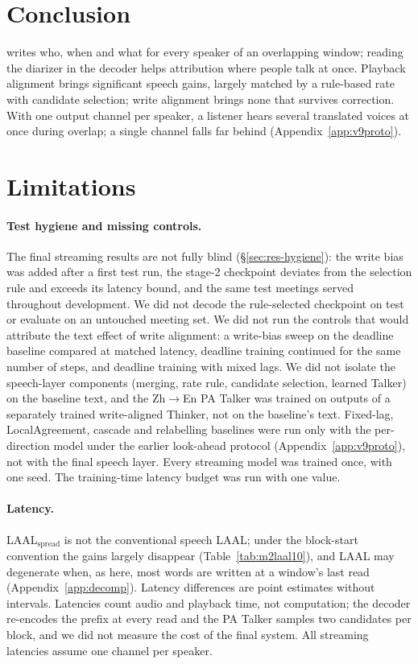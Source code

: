 \section{Conclusion}
\label{sec:conclusion}

\sys{} writes who, when and what for every speaker of an overlapping window; reading the diarizer in the decoder helps
attribution where people talk at once. Playback alignment brings significant speech gains, largely
matched by a rule-based rate with candidate selection; write alignment brings none that survives correction. With one
output channel per speaker, a listener hears several translated voices at once during overlap; a single channel falls
far behind (Appendix~\ref{app:v9proto}).

\section*{Limitations}

\paragraph{Test hygiene and missing controls.} The final streaming results are not fully blind
(\S\ref{sec:res-hygiene}): the write bias was added after a first test run, the stage-2 checkpoint deviates from the
selection rule and exceeds its latency bound, and the same test meetings served throughout development. We did not
decode the rule-selected checkpoint on test or evaluate on an untouched meeting set. We did not run the controls that
would attribute the text effect of write alignment: a write-bias sweep on the deadline baseline compared at matched
latency, deadline training continued for the same number of steps, and deadline training with mixed lags. We did not
isolate the speech-layer components (merging, rate rule, candidate selection, learned Talker) on the baseline text, and
the Zh$\rightarrow$En PA Talker was trained on outputs of a separately trained write-aligned Thinker, not on the
baseline's text. Fixed-lag, LocalAgreement, cascade and relabelling baselines were run only with the per-direction model under
the earlier look-ahead protocol (Appendix~\ref{app:v9proto}), not with the final speech layer. Every streaming model was
trained once, with one seed. The training-time latency budget was run with one value.

\paragraph{Latency.} LAAL$_\text{spread}$ is not the conventional speech LAAL; under the block-start convention the
gains largely disappear (Table~\ref{tab:m2laal10}), and LAAL may degenerate when, as here, most words are written at a
window's last read (Appendix~\ref{app:decomp}). Latency differences are point estimates without intervals. Latencies
count audio and playback time, not computation; the decoder re-encodes the prefix at every read and the PA Talker
samples two candidates per block, and we did not measure the cost of the final system. All streaming latencies assume
one channel per speaker.

